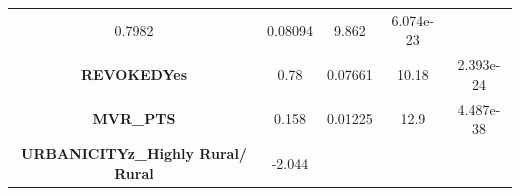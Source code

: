 \documentclass[]{article}
\begin{document}
\begin{longtable}[]{@{}ccccc@{}}
\begin{minipage}[t]{0.14\columnwidth}
0.7982\strut
\end{minipage} & \begin{minipage}[t]{0.14\columnwidth}\centering\strut
0.08094\strut
\end{minipage} & \begin{minipage}[t]{0.11\columnwidth}\centering\strut
9.862\strut
\end{minipage} & \begin{minipage}[t]{0.12\columnwidth}\centering\strut
6.074e-23\strut
\end{minipage}\tabularnewline
\begin{minipage}[t]{0.33\columnwidth}\centering\strut
\textbf{REVOKEDYes}\strut
\end{minipage} & \begin{minipage}[t]{0.14\columnwidth}\centering\strut
0.78\strut
\end{minipage} & \begin{minipage}[t]{0.14\columnwidth}\centering\strut
0.07661\strut
\end{minipage} & \begin{minipage}[t]{0.11\columnwidth}\centering\strut
10.18\strut
\end{minipage} & \begin{minipage}[t]{0.12\columnwidth}\centering\strut
2.393e-24\strut
\end{minipage}\tabularnewline
\begin{minipage}[t]{0.33\columnwidth}\centering\strut
\textbf{MVR\_PTS}\strut
\end{minipage} & \begin{minipage}[t]{0.14\columnwidth}\centering\strut
0.158\strut
\end{minipage} & \begin{minipage}[t]{0.14\columnwidth}\centering\strut
0.01225\strut
\end{minipage} & \begin{minipage}[t]{0.11\columnwidth}\centering\strut
12.9\strut
\end{minipage} & \begin{minipage}[t]{0.12\columnwidth}\centering\strut
4.487e-38\strut
\end{minipage}\tabularnewline
\begin{minipage}[t]{0.33\columnwidth}\centering\strut
\textbf{URBANICITYz\_Highly Rural/ Rural}\strut
\end{minipage} & \begin{minipage}[t]{0.14\columnwidth}\centering\strut
-2.044\strut
\end{minipage} & \begin{minipage}[t]{0.14\columnwidth}\centering\strut

\end{minipage}
\end{longtable}
\end{document}
